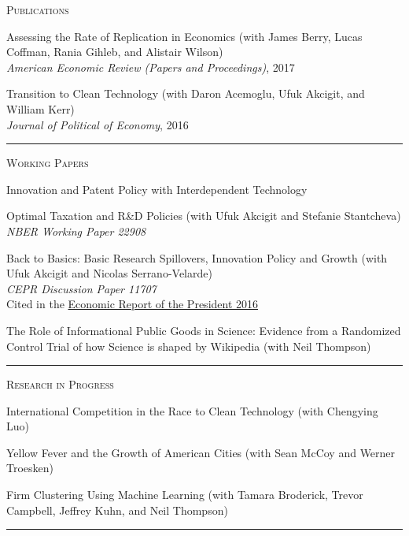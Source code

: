 \documentclass{article}
\begin{document}
\parbox{\textwidth}{
\parbox[t]{0.28\textwidth}{ \raggedright \noindent \textsc{ Publications } }
\parbox[t]{0.72\textwidth}{ \raggedright

Assessing the Rate of Replication in Economics (with James Berry, Lucas Coffman, Rania Gihleb, and Alistair Wilson) \\
\textit{American Economic Review (Papers and Proceedings)}, 2017
\vspace{0.27cm}

Transition to Clean Technology (with Daron Acemoglu, Ufuk Akcigit, and William Kerr) \\
\textit{Journal of Political of Economy}, 2016
\vspace{0.27cm}

}
\textcolor{light-gray}{\hrule}
}
\vspace{0.3cm}

\parbox{\textwidth}{
\parbox[t]{0.28\textwidth}{ \raggedright \noindent \textsc{ Working Papers } }
\parbox[t]{0.72\textwidth}{ \raggedright

Innovation and Patent Policy with Interdependent Technology
\vspace{0.27cm}

Optimal Taxation and R\&D Policies (with Ufuk Akcigit and Stefanie Stantcheva)  \\
 \textit{NBER Working Paper 22908}
\vspace{0.27cm}

Back to Basics: Basic Research Spillovers, Innovation Policy and Growth (with Ufuk Akcigit and Nicolas Serrano-Velarde)  \\
 \textit{CEPR Discussion Paper 11707}  \\
 Cited in the \href{https://www.gpo.gov/fdsys/pkg/ERP-2016/pdf/ERP-2016.pdf}{Economic Report of the President 2016}
\vspace{0.27cm}

The Role of Informational Public Goods in Science: Evidence from a Randomized Control Trial of how Science is shaped by Wikipedia (with Neil Thompson)
\vspace{0.27cm}

}
\textcolor{light-gray}{\hrule}
}
\vspace{0.3cm}

\parbox{\textwidth}{
\parbox[t]{0.28\textwidth}{ \raggedright \noindent \textsc{ Research in Progress } }
\parbox[t]{0.72\textwidth}{ \raggedright

International Competition in the Race to Clean Technology (with Chengying Luo)
\vspace{0.27cm}

Yellow Fever and the Growth of American Cities (with Sean McCoy and Werner Troesken)
\vspace{0.27cm}

Firm Clustering Using Machine Learning (with Tamara Broderick, Trevor Campbell, Jeffrey Kuhn, and Neil Thompson)
\vspace{0.27cm}

}
\textcolor{light-gray}{\hrule}
}
\vspace{0.3cm}
\end{document}
